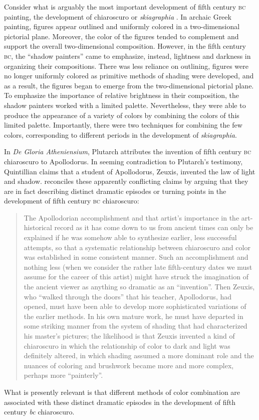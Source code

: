 Consider what is arguably the most important development of fifth century \textsc{bc} painting, the development of chiaroscuro or \emph{skiagraphia} \citep[see][]{Bruno:1977fk,Keuls:1975uq,Pemberton:1976kx}. In archaic Greek painting, figures appear outlined and uniformly colored in a two-dimensional pictorial plane. Moreover, the color of the figures tended to complement and support the overall two-dimensional composition. However, in the fifth century \textsc{bc}, the ``shadow painters'' came to emphasize, instead, lightness and darkness in organizing their compositions. There was less reliance on outlining, figures were no longer uniformly colored as primitive methods of shading were developed, and as a result, the figures began to emerge from the two-dimensional pictorial plane. To emphasize the importance of relative brightness in their composition, the shadow painters worked with a limited palette. Nevertheless, they were able to produce the appearance of a variety of colors by combining the colors of this limited palette. Importantly, there were two techniques for combining the few colors, corresponding to different periods in the development of \emph{skiagraphia}.

In \emph{De Gloria Atheniensium}, Plutarch attributes the invention of fifth century \textsc{bc} chiaroscuro to Apollodorus. In seeming contradiction to Plutarch's testimony, Quintillian claims that a student of Apollodorus, Zeuxis, invented the law of light and shadow. \citet[27--29]{Bruno:1977fk} reconciles these apparently conflicting claims by arguing that they are in fact describing distinct dramatic episodes or turning points in the development of fifth century \textsc{bc} chiaroscuro:
\begin{quote}
    The Apollodorian accomplishment and that artist's importance in the art-historical record as it has come down to us from ancient times can only be explained if he was somehow able to synthesize earlier, less successful attempts, so that a systematic relationship between chiaroscuro and color was established in some consistent manner. Such an accomplishment and nothing less (when we consider the rather late fifth-century dates we must assume for the career of this artist) might have struck the imagination of the ancient viewer as anything so dramatic as an ``invention''. Then Zeuxis, who ``walked through the doors'' that his teacher, Apollodorus, had opened, must have been able to develop more sophisticated variations of the earlier methods. In his own mature work, he must have departed in some striking manner from the system of shading that had characterized his master's pictures; the likelihood is that Zeuxis invented a kind of chiaroscuro in which the relationship of color to dark and light was definitely altered, in which shading assumed a more dominant role and the nuances of coloring and brushwork became more and more complex, perhaps more ``painterly''. \citep[29]{Bruno:1977fk}
\end{quote}
What is presently relevant is that different methods of color combination are associated with these distinct dramatic episodes in the development of fifth century \emph{bc} chiaroscuro.


